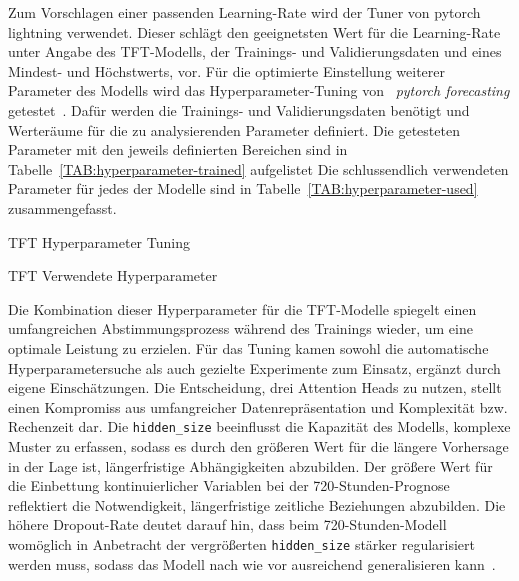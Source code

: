 Zum Vorschlagen einer passenden Learning-Rate wird der Tuner von pytorch lightning verwendet.
Dieser schlägt den geeignetsten Wert für die Learning-Rate unter Angabe des \ac{TFT}-Modells, der Trainings- und Validierungsdaten und eines Mindest- und Höchstwerts, vor.
Für die optimierte Einstellung weiterer Parameter des Modells wird das Hyperparameter-Tuning von ~\textit{pytorch forecasting} getestet~\cite{PytorchForecastingDocumentation.20230410T20:05:46.000Z}.
Dafür werden die Trainings- und Validierungsdaten benötigt und Werteräume für die zu analysierenden Parameter definiert.
Die getesteten Parameter mit den jeweils definierten Bereichen sind in Tabelle~\ref{TAB:hyperparameter-trained} aufgelistet
Die schlussendlich verwendeten Parameter für jedes der Modelle sind in Tabelle~\ref{TAB:hyperparameter-used} zusammengefasst.
\begin{table}[t]
 \small
 \caption{TFT Hyperparameter Tuning}
 \label{TAB:hyperparameter-trained}
 
\end{table}

\begin{table}[t]
 \small
 \caption{TFT Verwendete Hyperparameter}
 \label{TAB:hyperparameter-used}
 
\end{table}
Die Kombination dieser Hyperparameter für die \ac{TFT}-Modelle spiegelt einen umfangreichen Abstimmungsprozess während des Trainings wieder, um eine optimale Leistung zu erzielen.
Für das Tuning kamen sowohl die automatische Hyperparametersuche als auch gezielte Experimente zum Einsatz, ergänzt durch eigene Einschätzungen.
Die Entscheidung, drei Attention Heads zu nutzen, stellt einen Kompromiss aus umfangreicher Datenrepräsentation und Komplexität bzw. Rechenzeit dar.
Die \lstinline[columns=fixed]{hidden_size} beeinflusst die Kapazität des Modells, komplexe Muster zu erfassen, sodass es durch den größeren Wert für die längere Vorhersage in der Lage ist, längerfristige Abhängigkeiten abzubilden.
Der größere Wert für die Einbettung kontinuierlicher Variablen bei der 720-Stunden-Prognose reflektiert die Notwendigkeit, längerfristige zeitliche Beziehungen abzubilden.
Die höhere Dropout-Rate deutet darauf hin, dass beim 720-Stunden-Modell womöglich in Anbetracht der vergrößerten \lstinline[columns=fixed]{hidden_size} stärker regularisiert werden muss, sodass das Modell nach wie vor ausreichend generalisieren kann~\cite{Joseph.2022}.


